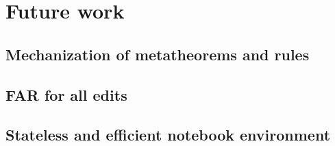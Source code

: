 \chapter{Future work}
\label{sec:future_work}

\section{Mechanization of metatheorems and rules}
\label{sec:formalization}

\section{FAR for all edits}
\label{sec:far_all_edits}


\section{Stateless and efficient notebook environment}
\label{sec:notebook_ui_future}


